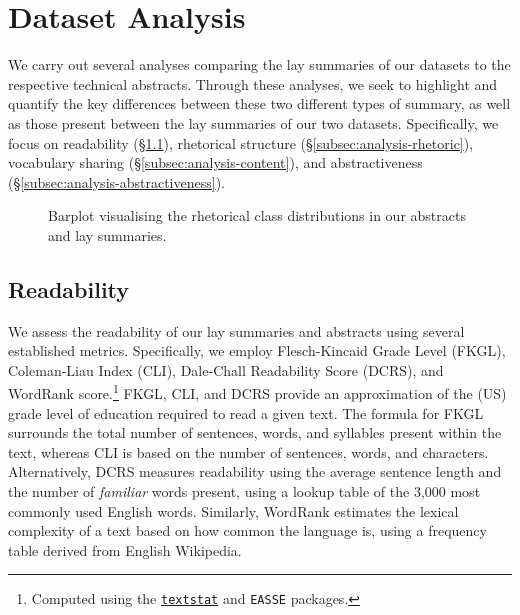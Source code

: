 \documentclass[11pt]{article}
\begin{document}
\section{Dataset Analysis} \label{sec:analysis}
We carry out several analyses comparing the lay summaries of our datasets to the respective technical abstracts. Through these analyses, we seek to highlight and quantify the key differences between these two different types of summary, as well as those present between the lay summaries of our two datasets. Specifically, we focus on readability (\S\ref{subsec:analysis-readability}), rhetorical structure (\S\ref{subsec:analysis-rhetoric}), vocabulary sharing (\S\ref{subsec:analysis-content}), and abstractiveness (\S\ref{subsec:analysis-abstractiveness}).








\begin{figure*}[t]
    \centering
    \caption{Barplot visualising the rhetorical class distributions in our abstracts and lay summaries.}
    \label{fig:discourse_comp}
\end{figure*}


\subsection{Readability} \label{subsec:analysis-readability}
We assess the readability of our lay summaries and abstracts using several established metrics. Specifically, we employ Flesch-Kincaid Grade Level (FKGL), Coleman-Liau Index (CLI), Dale-Chall Readability Score (DCRS), and WordRank score.\footnote{Computed using the \href{https://github.com/shivam5992/textstat}{\texttt{textstat}} and \texttt{EASSE} \citep{alva-manchego-etal-2019-easse} packages.} FKGL, CLI, and DCRS provide an approximation of the (US) grade level of education required to read a given text. The formula for FKGL surrounds the total number of sentences, words, and syllables present within the text, whereas CLI is based on the number of sentences, words, and characters.  Alternatively, DCRS measures readability using the average sentence length and the number of \textit{familiar} words present, using a lookup table of the 3,000 most commonly used English words. Similarly, WordRank estimates the lexical complexity of a text based on how common the language is, using a frequency table derived from English Wikipedia.
\end{document}
